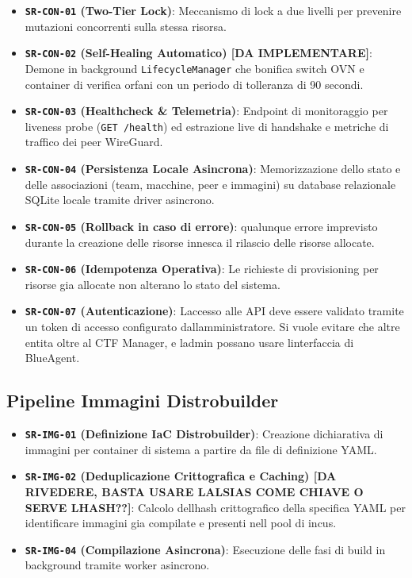 \begin{itemize}
\tightlist
\item
  \textbf{\passthrough{\lstinline!SR-CON-01!} (Two-Tier Lock)}:
  Meccanismo di lock a due livelli per prevenire mutazioni concorrenti
  sulla stessa risorsa.
\item
  \textbf{\passthrough{\lstinline!SR-CON-02!} (Self-Healing Automatico)
  {[}DA IMPLEMENTARE{]}}: Demone in background
  \passthrough{\lstinline!LifecycleManager!} che bonifica switch OVN e
  container di verifica orfani con un periodo di tolleranza di 90
  secondi.
\item
  \textbf{\passthrough{\lstinline!SR-CON-03!} (Healthcheck \&
  Telemetria)}: Endpoint di monitoraggio per liveness probe
  (\passthrough{\lstinline!GET /health!}) ed estrazione live di
  handshake e metriche di traffico dei peer WireGuard.
\item
  \textbf{\passthrough{\lstinline!SR-CON-04!} (Persistenza Locale
  Asincrona)}: Memorizzazione dello stato e delle associazioni (team,
  macchine, peer e immagini) su database relazionale SQLite locale
  tramite driver asincrono.
\item
  \textbf{\passthrough{\lstinline!SR-CON-05!} (Rollback in caso di
  errore)}: qualunque errore imprevisto durante la creazione delle
  risorse innesca il rilascio delle risorse allocate.
\item
  \textbf{\passthrough{\lstinline!SR-CON-06!} (Idempotenza Operativa)}:
  Le richieste di provisioning per risorse gia allocate non alterano lo
  stato del sistema.
\item
  \textbf{\passthrough{\lstinline!SR-CON-07!} (Autenticazione)}:
  L\textquotesingle accesso alle API deve essere validato tramite un
  token di accesso configurato dall\textquotesingle amministratore. Si
  vuole evitare che altre entita oltre al CTF Manager, e
  l\textquotesingle admin possano usare l\textquotesingle interfaccia di
  BlueAgent.
\end{itemize}

\subsection{Pipeline Immagini
Distrobuilder}\label{pipeline-immagini-distrobuilder}

\begin{itemize}
\tightlist
\item
  \textbf{\passthrough{\lstinline!SR-IMG-01!} (Definizione IaC
  Distrobuilder)}: Creazione dichiarativa di immagini per container di
  sistema a partire da file di definizione YAML.
\item
  \textbf{\passthrough{\lstinline!SR-IMG-02!} (Deduplicazione
  Crittografica e Caching) {[}DA RIVEDERE, BASTA USARE
  L\textquotesingle ALSIAS COME CHIAVE O SERVE
  L\textquotesingle HASH??{]}}: Calcolo dell\textquotesingle hash
  crittografico della specifica YAML per identificare immagini gia
  compilate e presenti nell pool di incus.
\item
  \textbf{\passthrough{\lstinline!SR-IMG-04!} (Compilazione Asincrona)}:
  Esecuzione delle fasi di build in background tramite worker asincrono.
\end{itemize}
